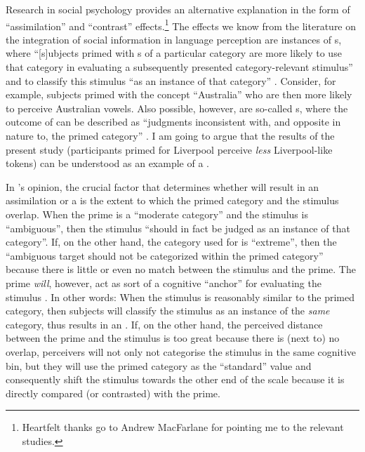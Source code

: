 Research in social psychology provides an alternative explanation in the form of ``assimilation'' and ``contrast'' effects.\footnote{Heartfelt thanks go to Andrew MacFarlane for pointing me to the relevant studies.}
The  effects we know from the literature on the integration of social information in language perception are instances of s, where ``[s]ubjects primed with s of a particular category are more likely to use that category in evaluating a subsequently presented category-relevant stimulus'' and to classify this stimulus ``as an instance of that category'' \parencite[1106--1107]{herr1986}.
Consider, for example, subjects primed with the concept ``Australia'' who are then more likely to perceive Australian vowels.
Also possible, however, are so-called s, where the outcome of  can be described as ``judgments inconsistent with, and opposite in nature to, the primed category'' \parencite[1107]{herr1986}.
I am going to argue that the results of the present study (participants primed for Liverpool perceive \emph{less} Liverpool-like tokens) can be understood as an example of a .

In \citeauthor{herr1986}'s opinion, the crucial factor that determines whether  will result in an assimilation or a  is the extent to which the primed category and the stimulus overlap.
When the prime is a ``moderate category'' and the stimulus is ``ambiguous'', then the stimulus ``should in fact be judged as an instance of that category''.
If, on the other hand, the category used for  is ``extreme'', then the ``ambiguous target should not be categorized within the primed category'' because there is little or even no match between the stimulus and the prime.
The prime \emph{will}, however, act as sort of a cognitive ``anchor'' for evaluating the stimulus \parencite[cf.][1107]{herr1986}.
In other words: When the stimulus is reasonably similar to the primed category, then subjects will classify the stimulus as an instance of the \emph{same} category,  thus results in an .
If, on the other hand, the perceived distance between the prime and the stimulus is too great because there is (next to) no overlap, perceivers will not only not categorise the stimulus in the same cognitive bin, but they will use the primed category as the ``standard'' value and consequently shift the stimulus towards the other end of the scale because it is directly compared (or contrasted) with the prime.

